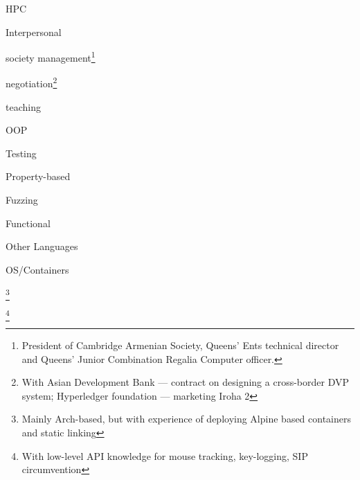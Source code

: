 \documentclass{CurriculumVitae}[10pt, condensed]
\begin{document}
\begin{multicols}{4}
    \begin{skills}{HPC}
    \item {}
    \item {}
    \item {}
    \item {}
    \item {}
    \item {}
    \end{skills}

    \begin{skills}{Interpersonal}
    \item society management\footnote{President of Cambridge Armenian
        Society, Queens' Ents technical director and Queens' Junior
        Combination Regalia Computer officer. }
    \item negotiation\footnote{With Asian Development Bank ---
        contract on designing a cross-border DVP system; Hyperledger
        foundation ---  marketing Iroha 2}
    \item teaching
    \end{skills}

    \begin{skills}{OOP}
    \item {}
    \item {}
    \item {}
    \end{skills}

    
    \begin{skills}{Testing}
    \item {\footnotesize Property-based}
    \item {\footnotesize Fuzzing}
    \item {\footnotesize Functional}
    \end{skills}

    \begin{skills}{Other Languages}
    \item {}
    \item {}
    \item {}
    \end{skills}

    \begin{skills}{OS/Containers}
    \item {}
    \item {}\footnote{Mainly Arch-based, but with experience
        of deploying Alpine based containers and static linking}
    \item {}
    \item {}\footnote{With low-level API knowledge for
        mouse tracking, key-logging, SIP circumvention}
    \end{skills}
    
  \end{multicols}
\vfill
\end{document}
